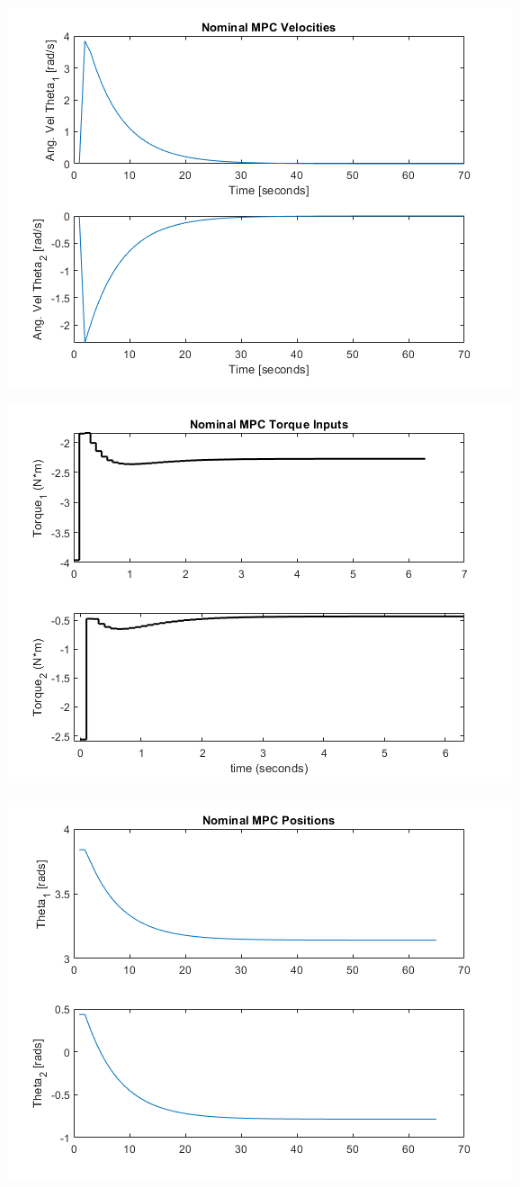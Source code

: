 \documentclass[journal]{IEEEtran}
\begin{document}
\includegraphics[scale = 0.5]{../images/Nominal_MPC/T1_X_init_25_45_0_0_X_ref_180_n45_0_0/AngularVelocities}




\includegraphics[scale = 0.5]{../images/Nominal_MPC/T4_X_init_220_25_0_0_X_ref_180_n45_0_0/Torques}


\includegraphics[scale = 0.5]{../images/Nominal_MPC/T4_X_init_220_25_0_0_X_ref_180_n45_0_0/AngularPositions}
\end{document}
